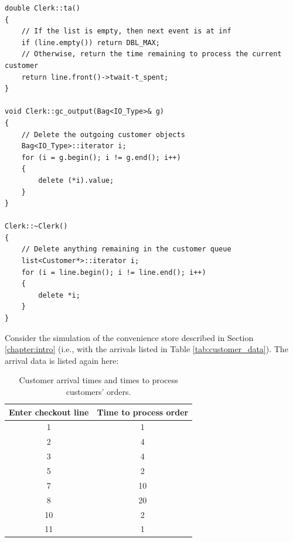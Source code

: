 \begin{verbatim}
double Clerk::ta()
{
    // If the list is empty, then next event is at inf
    if (line.empty()) return DBL_MAX;
    // Otherwise, return the time remaining to process the current customer
    return line.front()->twait-t_spent;
}

void Clerk::gc_output(Bag<IO_Type>& g)
{
    // Delete the outgoing customer objects
    Bag<IO_Type>::iterator i;
    for (i = g.begin(); i != g.end(); i++)
    {
        delete (*i).value;
    }
}

Clerk::~Clerk()
{
    // Delete anything remaining in the customer queue
    list<Customer*>::iterator i;
    for (i = line.begin(); i != line.end(); i++)
    {
        delete *i;
    }
}
\end{verbatim}

Consider the simulation of the convenience store described in Section \ref{chapter:intro} (i.e., with the arrivals listed in Table \ref{tab:customer_data}). The arrival data is listed again here: 
\begin{table}[h]
\centering
\begin{tabular}{|c|c|}
\hline
Enter checkout line & Time to process order \\ \hline
1 & 1 \\ \hline
2 & 4 \\ \hline
3 & 4 \\ \hline
5 & 2 \\ \hline
7 & 10 \\ \hline
8 & 20 \\ \hline
10 & 2 \\ \hline
11 & 1 \\ \hline
\end{tabular}
\caption{Customer arrival times and times to process customers' orders.}
\label{tab:customer_data_again}
\end{table}

